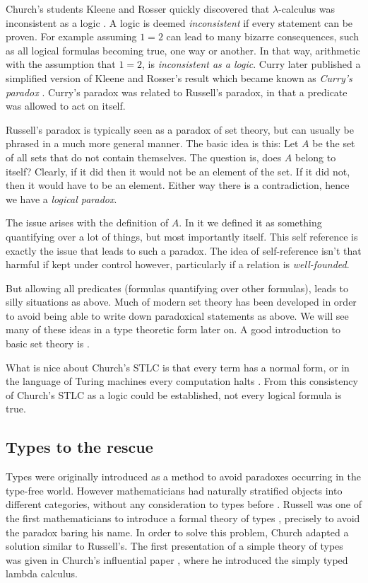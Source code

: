 Church's students Kleene and Rosser quickly discovered that $\lambda$-calculus was inconsistent as a logic \cite{kleene1935c}.
A logic is deemed \emph{inconsistent} if every statement can be proven.
For example assuming $1 = 2$ can lead to many bizarre consequences, such as all logical formulas becoming true, one way or another.
In that way, arithmetic with the assumption that $1 = 2$, is \emph{inconsistent as a logic}.
Curry later published a simplified version of Kleene and Rosser's result which became known as \emph{Curry's paradox} \cite{curry1942}.
Curry's paradox was related to Russell's paradox, in that a predicate was allowed to act on itself.

Russell's paradox is typically seen as a paradox of set theory, but can usually be phrased in a much more general manner. The basic idea is this: Let $A$ be the set of all sets that do not contain themselves. The question is, does $A$ belong to itself? Clearly, if it did then it would not be an element of the set. If it did not, then it would have to be an element. Either way there is a contradiction, hence we have a \emph{logical paradox}.

The issue arises with the definition of $A$. In it we defined it as something quantifying over a lot of things, but most importantly itself. This self reference is exactly the issue that leads to such a paradox. The idea of self-reference isn't that harmful if kept under control however, particularly if a relation is \emph{well-founded}.

But allowing all predicates (formulas quantifying over other formulas), leads to silly situations as above. Much of modern set theory has been developed in order to avoid being able to write down paradoxical statements as above. We will see many of these ideas in a type theoretic form later on. A good introduction to basic set theory is \cite{johnstone1987notes}.


What is nice about Church's STLC is that every term has a normal form, or in the language of Turing machines every computation halts \cite{turing1936a}. From this consistency of Church's STLC as a logic could be established, not every logical formula is true.

\subsection{Types to the rescue}

Types were originally introduced as a method to avoid paradoxes occurring in the type-free world.
However mathematicians had naturally stratified objects into different categories, without any consideration to types before \cite{GANDY1977173, kamareddine2002}.
Russell was one of the first mathematicians to introduce a formal theory of types \cite{GlossarWiki:Whitehead_Russell:1910}, precisely to avoid the paradox baring his name.
In order to solve this problem, Church adapted a solution similar to Russell's.
The first presentation of a simple theory of types was given in Church's influential paper \cite{church1940}, where he introduced the simply typed lambda calculus.

